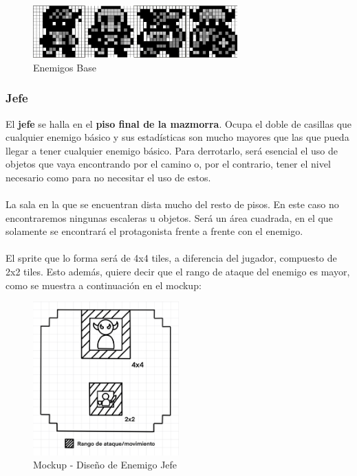 \begin{figure}[h]
\centering
\includegraphics[width=0.7\textwidth]{include/images/desarrollo/allenemies.jpg}
\caption{Enemigos Base}
\label{figure:allenemies}
\end{figure}

\clearpage

\subsubsection{Jefe}

El \textbf{jefe} se halla en el \textbf{piso final de la mazmorra}. Ocupa el doble de casillas que cualquier enemigo básico y sus estadísticas son mucho mayores que las que pueda llegar a tener cualquier enemigo básico. Para derrotarlo, será esencial el uso de objetos que vaya encontrando por el camino o, por el contrario, tener el nivel necesario como para no necesitar el uso de estos.
\\ \\
La sala en la que se encuentran dista mucho del resto de pisos. En este caso no encontraremos ningunas escaleras u objetos. Será un área cuadrada, en el que solamente se encontrará el protagonista frente a frente con el enemigo.
\\ \\
El sprite que lo forma será de 4x4 tiles, a diferencia del jugador, compuesto de 2x2 tiles. Esto además, quiere decir que el rango de ataque del enemigo es mayor, como se muestra a continuación en el mockup:

\begin{figure}[h]
\centering
\includegraphics[width=0.5\textwidth]{include/images/gdd/gdd_boss.png}
\caption{Mockup - Diseño de Enemigo Jefe}
\label{figure:protagonist}
\end{figure}


